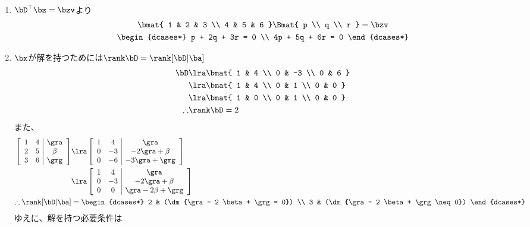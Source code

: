 \begin{ans*}
  ${}$
  \begin{enumerate}[label=(\arabic*)]
    \item $\bD^{\top}\bz = \bzv$より
    \begin{gather}
      \bmat{
        1 & 2 & 3 \\
        4 & 5 & 6
      }\Bmat{
        p \\ q \\ r
      } = \bzv \\
      \begin{dcases*}
        p + 2q + 3r = 0 \\
        4p + 5q + 6r = 0
      \end{dcases*}
    \end{gather}
    \item $\bx$が解を持つためには$\rank \bD = \rank [\bD|\ba]$
    \begin{align}
      \bD
      &\lra \bmat{
        1 & 4 \\
        0 & -3 \\
        0 & 6
      } \\
      &\lra \bmat{
        1 & 4 \\
        0 & 1 \\
        0 & 0
      } \\
      &\lra \bmat{
        1 & 0 \\
        0 & 1 \\
        0 & 0
      } \\
      \therefore & \rank \bD = 2
    \end{align}
    また、
    \begin{align}
      \left[\begin{array}{cc|c}
        1 & 4 & \gra \\
        2 & 5 & \beta \\
        3 & 6 & \grg
      \end{array}\right]
      &\lra \left[\begin{array}{cc|c}
        1 & 4 & \gra \\
        0 & -3 & -2 \gra + \beta \\
        0 & -6 & -3 \gra + \grg
      \end{array}\right] \\
      &\lra \left[\begin{array}{cc|c}
        1 & 4 & \gra \\
        0 & -3 & -2 \gra + \beta \\
        0 & 0 & \gra - 2 \beta + \grg
      \end{array}\right] \\
      \therefore\rank[\bD|\ba]&=
      \begin{dcases*}
        2 & (\dm{\gra - 2 \beta + \grg = 0}) \\
        3 & (\dm{\gra - 2 \beta + \grg \neq 0})
      \end{dcases*}
    \end{align}
    ゆえに、解を持つ必要条件は


\end{enumerate}
\end{ans*}
